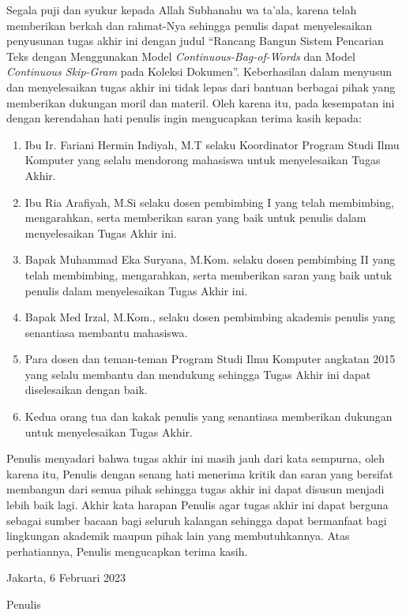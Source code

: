 \documentclass[12pt]{report}
\begin{document}
Segala puji dan syukur kepada Allah Subhanahu wa ta’ala, karena telah memberikan berkah dan rahmat-Nya sehingga penulis dapat menyelesaikan penyusunan tugas akhir ini dengan judul “Rancang Bangun Sistem Pencarian Teks dengan Menggunakan Model \textit{Continuous-Bag-of-Words} dan Model \textit{Continuous Skip-Gram} pada Koleksi Dokumen”. Keberhasilan dalam menyusun dan menyelesaikan tugas akhir ini tidak lepas dari bantuan berbagai pihak yang memberikan dukungan moril dan materil. Oleh karena itu, pada kesempatan ini dengan kerendahan hati penulis ingin mengucapkan terima kasih kepada:
\begin{enumerate}
\item Ibu Ir. Fariani Hermin Indiyah, M.T selaku Koordinator Program Studi Ilmu Komputer yang selalu mendorong mahasiswa untuk menyelesaikan Tugas Akhir.
\item Ibu Ria Arafiyah, M.Si selaku dosen pembimbing I yang telah membimbing, mengarahkan, serta memberikan saran yang baik untuk penulis dalam menyelesaikan Tugas Akhir ini.
\item Bapak Muhammad Eka Suryana, M.Kom. selaku dosen pembimbing II yang telah membimbing, mengarahkan, serta memberikan saran yang baik untuk penulis dalam menyelesaikan Tugas Akhir ini.
\item Bapak Med Irzal, M.Kom., selaku dosen pembimbing akademis penulis yang senantiasa membantu mahasiswa.
\item Para dosen dan teman-teman Program Studi Ilmu Komputer angkatan 2015 yang selalu membantu dan mendukung sehingga Tugas Akhir ini dapat diselesaikan dengan baik.
\item Kedua orang tua dan kakak penulis yang senantiasa memberikan dukungan untuk menyelesaikan Tugas Akhir.
\end{enumerate}
Penulis menyadari bahwa tugas akhir ini masih jauh dari kata sempurna, oleh karena itu, Penulis dengan senang hati menerima kritik dan saran yang bersifat membangun dari semua pihak sehingga tugas akhir ini dapat disusun menjadi lebih baik lagi.
Akhir kata harapan Penulis agar tugas akhir ini dapat berguna sebagai sumber bacaan bagi seluruh kalangan sehingga dapat bermanfaat bagi lingkungan akademik maupun pihak lain yang membutuhkannya. Atas perhatiannya, Penulis mengucapkan terima kasih.

\vspace*{0.5cm}
\begin{flushright}
Jakarta, 6 Februari 2023
\vspace*{1cm}

Penulis
\end{flushright}
\end{document}
